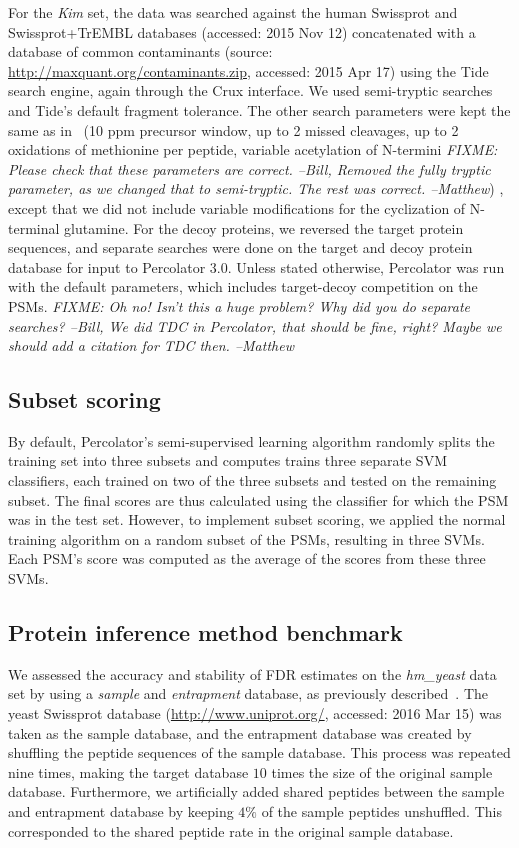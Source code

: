 \documentclass{article}
\begin{document}
For the {\em Kim} set, the data was searched against the human
Swissprot and Swissprot+TrEMBL databases (accessed: 2015 Nov 12)
concatenated with a database of common contaminants (source:
\url{http://maxquant.org/contaminants.zip}, accessed: 2015 Apr 17)
using the Tide search engine, again through the Crux interface. We
used semi-tryptic searches and Tide's default fragment tolerance. The
other search parameters were kept the same as in~\cite{kim2014draft}
(10 ppm precursor window, up to 2 missed cleavages, up to 2 oxidations
of methionine per peptide, variable acetylation of N-termini {\em
FIXME: Please check that these parameters are correct. --Bill, Removed
the fully tryptic parameter, as we changed that to semi-tryptic. The
rest was correct. --Matthew}) , except that we did not include
variable modifications for the cyclization of N-terminal glutamine.
For the decoy proteins, we reversed the target protein sequences, and
separate searches were done on the target and decoy protein database
for input to Percolator 3.0. Unless stated otherwise, Percolator was
run with the default parameters, which includes target-decoy
competition on the PSMs. {\em FIXME: Oh no! Isn't this a huge problem?
 Why did you do separate searches? --Bill, We did TDC in Percolator,
that should be fine, right? Maybe we should add a citation
for TDC then. --Matthew}

\subsection*{Subset scoring}

By default, Percolator's semi-supervised learning algorithm randomly
splits the training set into three subsets and computes trains three
separate SVM classifiers, each trained on two of the three subsets and
tested on the remaining subset.  The final scores are thus calculated
using the classifier for which the PSM was in the test set. However,
to implement subset scoring, we applied the normal training algorithm
on a random subset of the PSMs, resulting in three SVMs.  Each PSM's
score was computed as the average of the scores from these three SVMs.

\subsection*{Protein inference method benchmark}

We assessed the accuracy and stability of FDR estimates on the {\em
  hm\_yeast} data set by using a {\em sample} and {\em entrapment}
database, as previously described~\cite{granholm2013determining}. The
yeast Swissprot database (\url{http://www.uniprot.org/},
accessed: 2016 Mar 15) was
taken as the sample database, and the entrapment database was created
by shuffling the peptide sequences of the sample database. This
process was repeated nine times, making the target database $10$ times
the size of the original sample database.  Furthermore, we
artificially added shared peptides between the sample and entrapment
database by keeping $4\%$ of the sample peptides unshuffled.  This 
corresponded to the shared peptide rate in the original sample
database.
\end{document}

